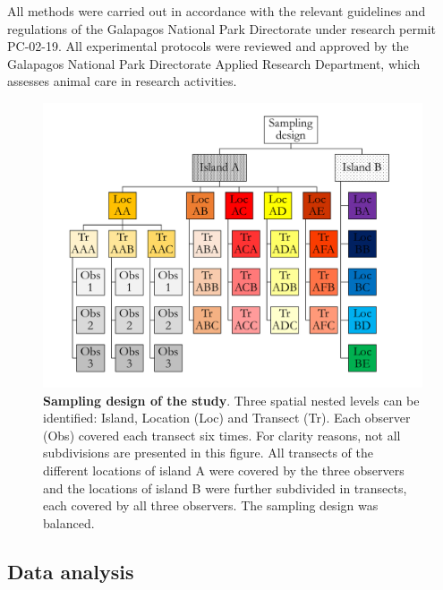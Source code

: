 \documentclass[10pt,letterpaper]{article}
\begin{document}
All methods were carried out in accordance with the relevant guidelines and regulations of the Galapagos National Park Directorate under research permit PC-02-19. All experimental protocols were reviewed and approved by the Galapagos National Park Directorate Applied Research Department, which assesses animal care in research activities.

\begin{figure}[h!]
  \centering\includegraphics[scale=0.5]{sampling_designv2.pdf}
  \caption{{\bf Sampling design of the study}. Three spatial nested levels can be identified: Island, Location (Loc) and Transect (Tr). Each observer (Obs) covered each transect six times. For clarity reasons, not all subdivisions are presented in this figure. All transects of the different locations of island A were covered by the three observers and the locations of island B were further subdivided in transects, each covered by all three observers. The sampling design was balanced.} 
  \label{fig:sampling_designv2}
\end{figure}


\subsection{Data analysis}
\label{Data_analysis}
\end{document}
